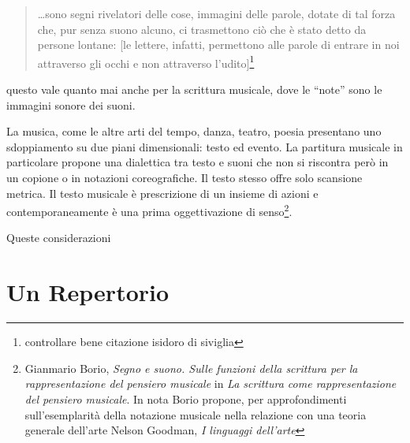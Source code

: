 \begin{quote}
	\ldots sono segni rivelatori delle cose, immagini delle parole, dotate di tal
	forza che, pur senza suono alcuno, ci trasmettono ciò che è stato detto da
	persone lontane: [le lettere, infatti, permettono alle parole di entrare in noi
	attraverso gli occhi e non attraverso l'udito]\footnote{controllare bene citazione
	isidoro di siviglia}
\end{quote}

questo vale quanto mai anche per la scrittura musicale, dove le “note” sono le
immagini sonore dei suoni.

La musica, come le altre arti del tempo, danza, teatro, poesia presentano uno
sdoppiamento su due piani dimensionali: testo ed evento. La partitura musicale
in particolare propone una dialettica tra testo e suoni che non si riscontra però
in un copione o in notazioni coreografiche. Il testo stesso offre solo scansione
metrica. Il testo musicale è prescrizione di un insieme di azioni e
contemporaneamente è una prima oggettivazione di senso\footnote{Gianmario Borio,
\emph{Segno e suono. Sulle funzioni della scrittura per la rappresentazione del
pensiero musicale} in \emph{La scrittura come rappresentazione del pensiero
musicale}. In nota Borio propone, per approfondimenti sull'esemplarità della
notazione musicale nella relazione con una teoria generale dell'arte Nelson
Goodman, \emph{I linguaggi dell'arte}}.

Queste considerazioni

\section{Un Repertorio}
